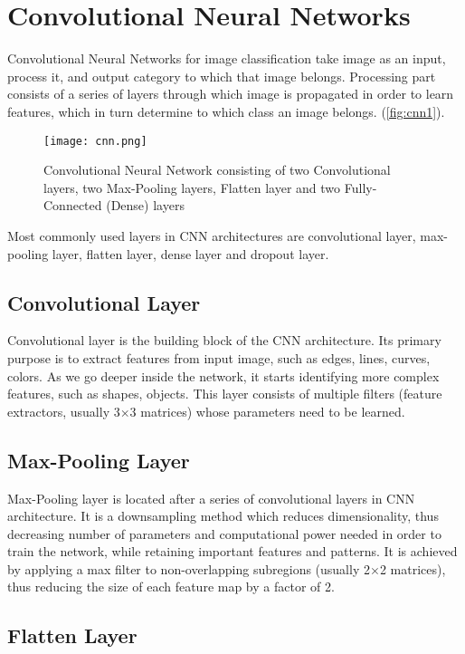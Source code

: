 \chapter{Convolutional Neural Networks}
\label{appx:simulation}

Convolutional Neural Networks for image classification \cite{krizhevsky2012imagenet} take image as an input, process it, and output category to which that image belongs. Processing part consists of a series of layers through which image is propagated in order to learn features, which in turn determine to which class an image belongs. (\textcolor{red}{\autoref{fig:cnn1}}).

\begin{figure}[h]
	\centering
	\texttt{[image: cnn.png]}
	\caption{Convolutional Neural Network consisting of two Convolutional layers, two Max-Pooling layers, Flatten layer and two Fully-Connected (Dense) layers}
	\label{fig:cnn1}
\end{figure}

Most commonly used layers in CNN architectures are convolutional layer, max-pooling layer, flatten layer, dense layer and dropout layer.

\section{Convolutional Layer}

Convolutional layer is the building block of the CNN architecture. Its primary purpose is to extract features from input image, such as edges, lines, curves, colors. As we go deeper inside the network, it starts identifying more complex features, such as shapes, objects. This layer consists of multiple filters (feature extractors, usually 3$\times$3 matrices) whose parameters need to be learned.
\section{Max-Pooling Layer}

Max-Pooling layer is located after a series of convolutional layers in CNN architecture. It is a downsampling method which reduces dimensionality, thus decreasing number of parameters and computational power needed in order to train the network, while retaining important features and patterns. It is achieved by applying a max filter to non-overlapping subregions (usually 2$\times$2 matrices), thus reducing the size of each feature map by a factor of 2.

\section{Flatten Layer}

